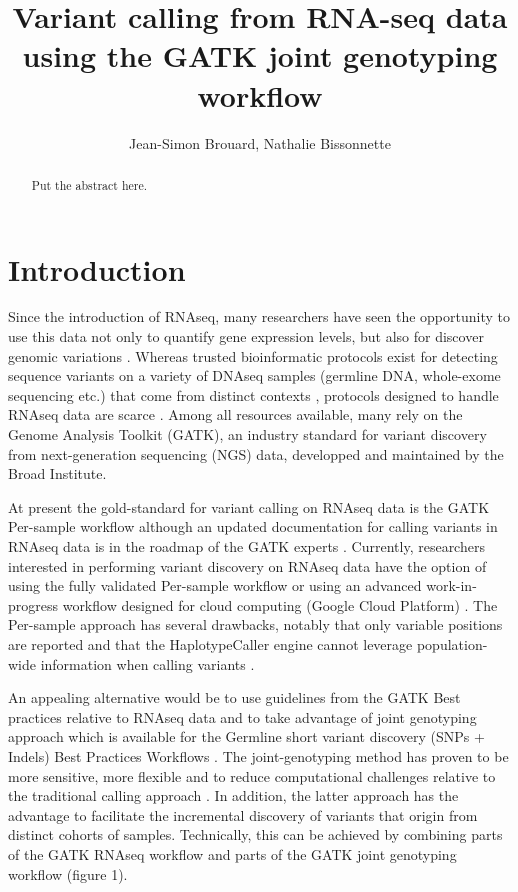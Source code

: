 \documentclass[]{article}
\title{Variant calling from RNA-seq data using the GATK joint genotyping workflow}
\author{Jean-Simon Brouard, Nathalie Bissonnette}
\begin{document}
\maketitle

\begin{abstract}
Put the abstract here.
\end{abstract}

\section{Introduction}
Since the introduction of RNAseq, many researchers have seen the opportunity to use this data not only to quantify gene expression levels, but also for discover genomic variations \cite{Piskol2013}. Whereas trusted bioinformatic protocols exist for detecting sequence variants on a variety of DNAseq samples (germline DNA, whole-exome sequencing etc.) that come from distinct contexts \cite{Koboldt2020}, protocols designed to handle RNAseq data are scarce \cite{Piskol2013}. Among all resources available, many rely on the Genome Analysis Toolkit (GATK), an industry standard for variant discovery from next-generation sequencing (NGS) data, developped and maintained by the Broad Institute.


At present the gold-standard for variant calling on RNAseq data is the GATK Per-sample workflow although an updated documentation for calling variants in RNAseq data is in the roadmap of the GATK experts \cite{GATK_best_RNAseq}. Currently, researchers interested in performing variant discovery on RNAseq data have the option of using the fully validated Per-sample workflow \cite{GATK_RNAseq_variant_discovery} or using an advanced work-in-progress workflow designed for cloud computing (Google Cloud Platform) \cite{GATK_gatk4_rnaseq_github}. The Per-sample approach has several drawbacks, notably that only variable positions are reported and that the HaplotypeCaller engine cannot leverage population-wide information when calling variants \cite{Brouard2019, GATK_RNAseq_variant_discovery}.

An appealing alternative would be to use guidelines from the GATK Best practices relative to RNAseq data and to take advantage of joint genotyping approach which is available for the Germline short variant discovery (SNPs + Indels) Best Practices Workflows \cite{GATK_BP_Germline}. The joint-genotyping method has proven to be more sensitive, more flexible and to reduce computational challenges relative to the traditional calling approach \cite{GATK_jointCalling_1}. In addition, the latter approach has the advantage to facilitate the incremental discovery of variants that origin from distinct cohorts of samples. Technically, this can be achieved by combining parts of the GATK RNAseq workflow and parts of the GATK joint genotyping workflow (figure 1).
\end{document}
